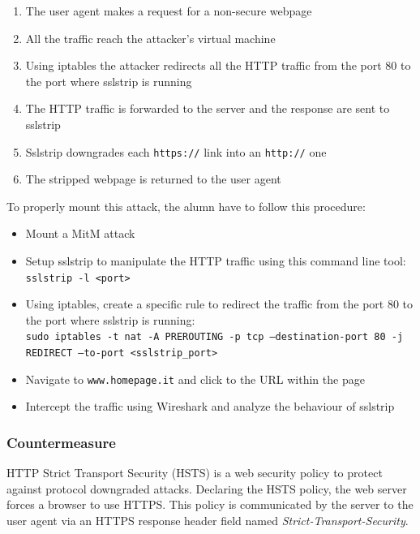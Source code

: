 \documentclass[final]{article}
\begin{document}
\begin{enumerate}
  \item The user agent makes a request for a non-secure webpage
  \item All the traffic reach the attacker's virtual machine
  \item Using iptables the attacker redirects all the HTTP traffic from the port 80 to the port where sslstrip is running
  \item The HTTP traffic is forwarded to the server and the response are sent to sslstrip
  \item Sslstrip downgrades each \texttt{https://} link into an \texttt{http://} one
  \item The stripped webpage is returned to the user agent
\end{enumerate}

\noindent To properly mount this attack, the alumn have to follow this procedure:
\begin{itemize}
  \item Mount a \ac{MitM} attack
  \item Setup sslstrip to manipulate the HTTP traffic using this command line tool: \texttt{sslstrip -l <port>}
  \item Using iptables, create a specific rule to redirect the traffic from the port 80 to the port where sslstrip is running:\\
  \texttt{sudo iptables -t nat -A PREROUTING -p tcp --destination-port 80 -j REDIRECT --to-port <sslstrip\_port>}
  \item Navigate to \texttt{www.homepage.it} and click to the URL within the page
  \item Intercept the traffic using Wireshark and analyze the behaviour of sslstrip
\end{itemize}

\subsubsection{Countermeasure}
HTTP Strict Transport Security (HSTS) is a web security policy to protect against protocol downgraded attacks.
Declaring the HSTS policy, the web server forces a browser to use HTTPS.
This policy is communicated by the server to the user agent via an HTTPS response header field named \textit{Strict-Transport-Security}.
\newpage
\end{document}
